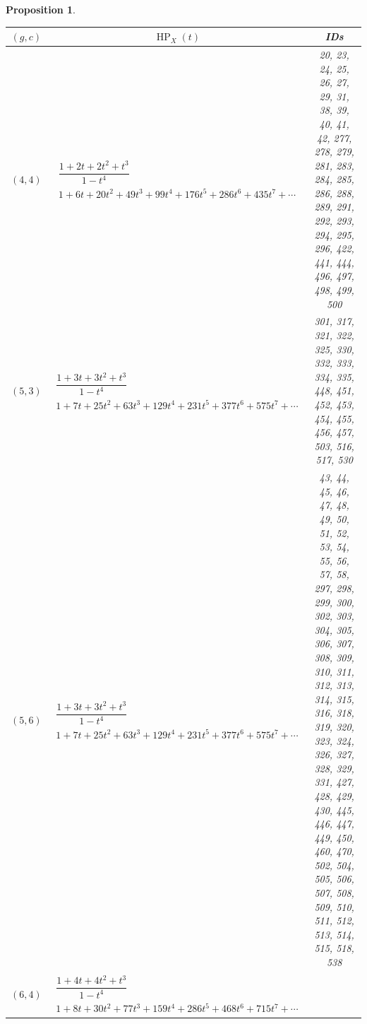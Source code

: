 \documentclass[10pt,a4paper]{amsart}
\newtheorem{prop}[thm]{Proposition}
\theoremstyle{definition}
\DeclareMathOperator\HP{HP}
\numberwithin{equation}{section}
\begin{document}
\begin{prop}
\begin{table}[h!]\centering\setlength{\tabcolsep}{4.5pt}
\renewcommand{\arraystretch}{1.3}\small\tabulinesep=1mm
\begin{tabu}{c|c|c}\hline
 $(g,c)$ & $\HP_X(t)$ & {\rm IDs}
 \\
 \hline
	$(4,4)$\label{T(4,4)}
	&
	$\begin{array}{c}
	 \dfrac{1+2t+2t^2+t^3}{1-t^4} \\[3pt]
	 {1+6t+20t^2+49t^3+99t^4+176t^5+286t^6+435t^7+\cdots}
	\end{array}$
	&
	 \begin{minipage}{4cm}
 \rm
 	20, 23, 24, 25, 26, 27, 29, 31, 38, 39,
 	40, 41, 42, 277, 278, 279, 281, 283, 284, 285,
	 286, 288, 289, 291, 292, 293, 294, 295, 296, 422,
	 441, 444, 496, 497, 498, 499, 500
 \end{minipage}
	\\ \hline
	$(5,3)$\label{T(3,5)}
	&
	$\begin{array}{c}
	 \dfrac{1+3t+3t^2+t^3}{1-t^4} \\[3pt]
	 {1+7t+25t^2+63t^3+129t^4+231t^5+377t^6+575t^7+\cdots}
	\end{array}$
	&
	 \begin{minipage}{4cm}
 \rm
 301, 317, 321, 322, 325, 330, 332, 333, 334, 335,
	 448, 451, 452, 453, 454, 455, 456, 457, 503, 516,
	 517, 530
 \end{minipage}
	\\ \hline
	$(5,6)$\label{T(6,5)}
	&
	$\begin{array}{c}
	 \dfrac{1+3t+3t^2+t^3}{1-t^4} \\[15pt]
	 {1+7t+25t^2+63t^3+129t^4+231t^5+377t^6+575t^7+\cdots}
	\end{array}$
	&
	 \begin{minipage}{4cm}
 \rm
 	43, 44, 45, 46, 47, 48, 49, 50, 51, 52,
	 53, 54, 55, 56, 57, 58, 297, 298, 299, 300,
	 302, 303, 304, 305, 306, 307, 308, 309, 310, 311,
	 312, 313, 314, 315, 316, 318, 319, 320, 323, 324,
	 326, 327, 328, 329, 331, 427, 428, 429, 430, 445,
	 446, 447, 449, 450, 460, 470, 502, 504, 505, 506,
	 507, 508, 509, 510, 511, 512, 513, 514, 515, 518,
	 538
 \end{minipage}
	\\ \hline
	$(6,4)$\label{T(4,6)}
	&
	$\begin{array}{c}
	 \dfrac{1+4t+4t^2+t^3}{1-t^4} \\[3pt]
	 {1+8t+30t^2+77t^3+159t^4+286t^5+468t^6+715t^7+\cdots}
	\end{array}$
	&
	 \begin{minipage}{4cm}

\end{minipage}
\end{tabu}
\end{table}
\end{prop}
\end{document}
